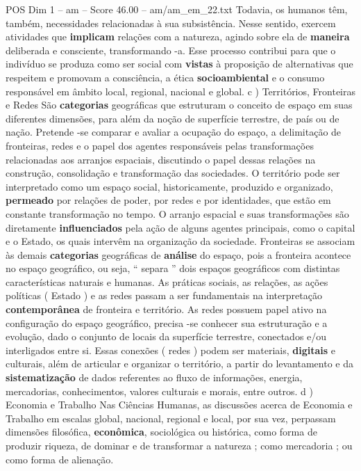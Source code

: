 \begin{textsample}{POS Dim 1 – am – Score 46.00 – am/am\_em\_22.txt}
Todavia, os humanos têm, também, necessidades relacionadas à sua subsistência.
Nesse sentido, exercem atividades que \textbf{implicam} relações com a natureza, agindo sobre ela de \textbf{maneira} deliberada e consciente, transformando -a.
Esse processo contribui para que o indivíduo se produza como ser social com \textbf{vistas} à proposição de alternativas que respeitem e promovam a consciência, a ética \textbf{socioambiental} e o consumo responsável em âmbito local, regional, nacional e global. c ) Territórios, Fronteiras e Redes São \textbf{categorias} geográficas que estruturam o conceito de espaço em suas diferentes dimensões, para além da noção de superfície terrestre, de país ou de nação.
Pretende -se comparar e avaliar a ocupação do espaço, a delimitação de fronteiras, redes e o papel dos agentes responsáveis pelas transformações relacionadas aos arranjos espaciais, discutindo o papel dessas relações na construção, consolidação e transformação das sociedades.
O território pode ser interpretado como um espaço social, historicamente, produzido e organizado, \textbf{permeado} por relações de poder, por redes e por identidades, que estão em constante transformação no tempo.
O arranjo espacial e suas transformações são diretamente \textbf{influenciados} pela ação de alguns agentes principais, como o capital e o Estado, os quais intervêm na organização da sociedade.
Fronteiras se associam às demais \textbf{categorias} geográficas de \textbf{análise} do espaço, pois a fronteira acontece no espaço geográfico, ou seja, “ separa ” dois espaços geográficos com distintas características naturais e humanas.
As práticas sociais, as relações, as ações políticas ( Estado ) e as redes passam a ser fundamentais na interpretação \textbf{contemporânea} de fronteira e território.
As redes possuem papel ativo na configuração do espaço geográfico, precisa -se conhecer sua estruturação e a evolução, dado o conjunto de locais da superfície terrestre, conectados e/ou interligados entre si.
Essas conexões ( redes ) podem ser materiais, \textbf{digitais} e culturais, além de articular e organizar o território, a partir do levantamento e da \textbf{sistematização} de dados referentes ao fluxo de informações, energia, mercadorias, conhecimentos, valores culturais e morais, entre outros. d ) Economia e Trabalho Nas Ciências Humanas, as discussões acerca de Economia e Trabalho em escalas global, nacional, regional e local, por sua vez, perpassam dimensões filosófica, \textbf{econômica}, sociológica ou histórica, como forma de produzir riqueza, de dominar e de transformar a natureza ; como mercadoria ; ou como forma de alienação.

\end{textsample}

